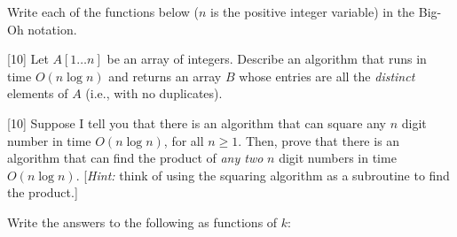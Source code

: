 \documentclass[addpoints]{exam}
\begin{document}
\begin{questions}

Write each of the functions below ($n$ is the positive integer variable) in the Big-Oh notation.


[10]
Let $A[1 \dots n]$ be an array of integers. Describe an algorithm that runs in time $O(n \log n)$ and returns an array $B$ whose entries are all the {\em distinct} elements of $A$ (i.e., with no duplicates).


[10]
Suppose I tell you that there is an algorithm that can square any $n$ digit number in time $O(n \log n)$, for all $n\ge 1$. Then, prove that there is an algorithm that can find the product of {\em any two} $n$ digit numbers in time $O(n \log n)$.  [{\em Hint:} think of using the squaring algorithm as a subroutine to find the product.]

Write the answers to the following as functions of $k$:


\end{questions}
\end{document}
